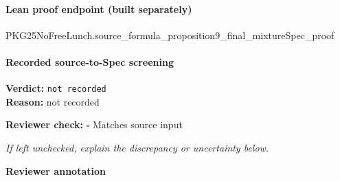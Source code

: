 \documentclass[10pt]{article}
\newcommand{\reviewerbox}{%
  \par\noindent\fbox{\parbox{0.96\linewidth}{\rule{0pt}{0.38in}}}\par
}
\newcommand{\reviewmatch}[1]{%
  \par\noindent\textbf{Reviewer check:} $\square$\; #1\par
  \noindent\emph{If left unchecked, explain the discrepancy or uncertainty below.}\par
}
\begin{document}
\paragraph{Lean proof endpoint (built separately)}\begin{ReviewVerbatim}
PKG25NoFreeLunch.source_formula_proposition9_final_mixtureSpec_proof
\end{ReviewVerbatim}

\paragraph{Recorded source-to-Spec screening}
\textbf{Verdict:} \texttt{not recorded}
\\
\textbf{Reason:} not recorded
\reviewmatch{Matches source input}
\noindent\textbf{Reviewer annotation}\par
\reviewerbox
\end{document}
